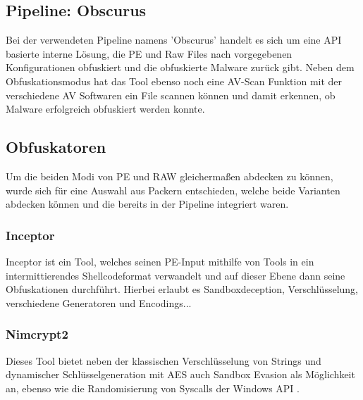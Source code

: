 \subsection{Pipeline: Obscurus}
Bei der verwendeten Pipeline namens 'Obscurus' handelt es sich um eine API basierte interne Lösung, die PE und Raw Files nach vorgegebenen Konfigurationen obfuskiert und die obfuskierte Malware zurück gibt. Neben dem Obfuskationsmodus hat das Tool ebenso noch eine AV-Scan Funktion mit der verschiedene AV Softwaren ein File scannen können und damit erkennen, ob Malware erfolgreich obfuskiert werden konnte.

\subsection{Obfuskatoren}
Um die beiden Modi von PE und RAW gleichermaßen abdecken zu können, wurde sich für eine Auswahl aus Packern entschieden, welche beide Varianten abdecken können und die bereits in der Pipeline integriert waren.
    \subsubsection{Inceptor}
    Inceptor ist ein Tool, welches seinen PE-Input mithilfe von Tools in ein intermittierendes Shellcodeformat verwandelt und auf dieser Ebene dann seine Obfuskationen durchführt. Hierbei erlaubt es Sandboxdeception, Verschlüsselung, verschiedene Generatoren und Encodings...
    \cite{wauters_2024_building,klezvirus_templatedriven} 
    \subsubsection{Nimcrypt2}
    Dieses Tool bietet neben der klassischen Verschlüsselung von Strings und dynamischer Schlüsselgeneration mit AES auch Sandbox Evasion als Möglichkeit an, ebenso wie die Randomisierung von Syscalls der Windows API \cite{icyguider_2022_github}.